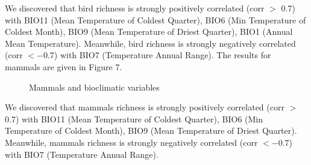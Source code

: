 \documentclass{article}
\begin{document}
We discovered that bird richness is strongly positively correlated (corr $>$ 0.7) with BIO11 (Mean Temperature of Coldest Quarter), BIO6 (Min Temperature of Coldest Month), BIO9 (Mean Temperature of Driest Quarter), BIO1 (Annual Mean Temperature). Meanwhile, bird richness is strongly negatively correlated (corr $< -0.7$) with BIO7 (Temperature Annual Range). The results for mammals are given in Figure 7.
\par
\begin{figure}[h]
	\vspace*{-3mm}
	\centering
	\vspace*{-2mm}
	\caption{Mammals and bioclimatic variables}
\end{figure}
We discovered that mammals richness is strongly positively correlated (corr $>$ 0.7) with BIO11 (Mean Temperature of Coldest Quarter), BIO6 (Min Temperature of Coldest Month), BIO9 (Mean Temperature of Driest Quarter). Meanwhile, mammals richness is strongly negatively correlated (corr $< -0.7$) with BIO7 (Temperature Annual Range).
\end{document}
